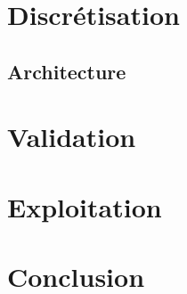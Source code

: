\documentclass[a4paper,oneside]{article}
\begin{document}
\section{Discrétisation}

\subsection{Architecture}







\section{Validation}


\section{Exploitation}


\section{Conclusion}
\end{document}
